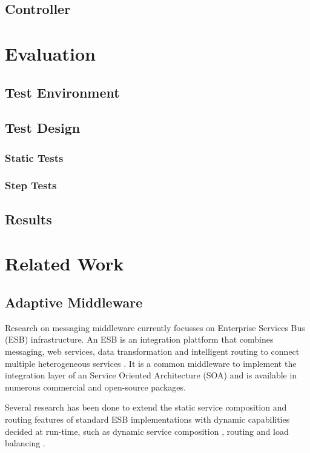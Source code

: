 \subsection{Controller}

\section{Evaluation}

\subsection{Test Environment}

\subsection{Test Design}

\subsubsection{Static Tests}

\subsubsection{Step Tests}

\subsection{Results}

\section{Related Work}\label{sec:ch5_related_work}
\subsection{Adaptive Middleware}
Research on messaging middleware currently focusses on Enterprise Services Bus (ESB) infrastructure. An ESB is an integration plattform that combines messaging, web services, data transformation and intelligent routing to connect multiple heterogeneous services \citep{Chappell:2004jo}. It is a common middleware to implement the integration layer of an Service Oriented Architecture (SOA) and is available in numerous commercial and open-source packages.

Several research has been done to extend the static service composition and routing features of standard ESB implementations with dynamic capabilities decided at run-time, such as dynamic service composition \citep{Chang:2007aa}, routing \citep{Bai:2007aa} \citep{Wu:2008aa} \citep{Ziyaeva:2008aa} and load balancing \citep{Jongtaveesataporn:2010aa}.

